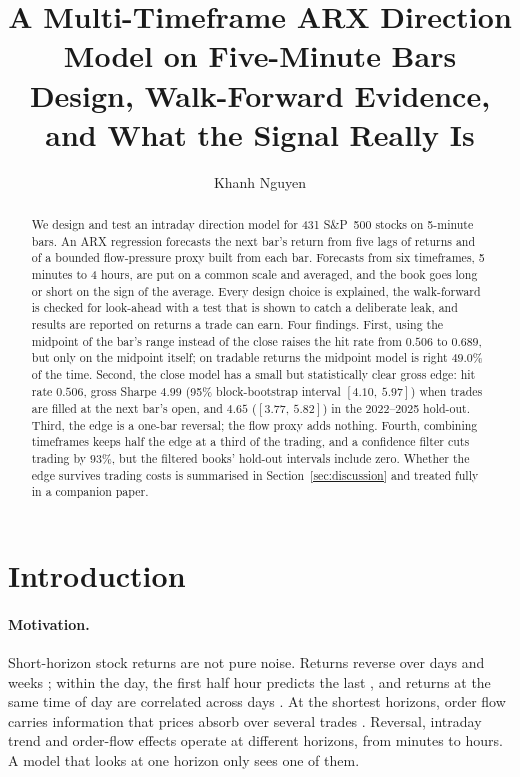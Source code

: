 \documentclass[11pt,a4paper]{article}
\title{\textbf{A Multi-Timeframe ARX Direction Model on Five-Minute Bars}\\[0.4em]
\large Design, Walk-Forward Evidence, and What the Signal Really Is}
\author{Khanh Nguyen}
\date{}
\begin{document}
\maketitle

\begin{abstract}
\noindent We design and test an intraday direction model for 431 S\&P~500 stocks on 5-minute
bars. An ARX regression forecasts the next bar's return from five lags of returns and of a bounded
flow-pressure proxy built from each bar. Forecasts from six timeframes, 5 minutes to 4 hours, are put
on a common scale and averaged, and the book goes long or short on the sign of the average. Every
design choice is explained, the walk-forward is checked for look-ahead with a test that is shown to
catch a deliberate leak, and results are reported on returns a trade can earn. Four findings. First,
using the midpoint of the bar's range instead of the close raises the hit rate from $0.506$ to
$0.689$, but only on the midpoint itself; on tradable returns the midpoint model is right
$49.0\%$ of the time. Second, the close model has a small but statistically clear gross edge: hit rate $0.506$, gross
Sharpe $4.99$ (95\% block-bootstrap interval $[4.10,\ 5.97]$) when trades are filled at the next bar's open,
and $4.65$ ($[3.77,\ 5.82]$) in the 2022--2025 hold-out. Third, the edge is a one-bar reversal; the flow proxy
adds nothing. Fourth, combining timeframes keeps half the edge at a third of the trading, and a
confidence filter cuts trading by $93\%$, but the filtered books' hold-out intervals include zero. Whether the edge survives trading costs
is summarised in Section~\ref{sec:discussion} and treated fully in a companion paper.
\end{abstract}

\section{Introduction}
\label{sec:intro}

\paragraph{Motivation.} Short-horizon stock returns are not pure noise. Returns reverse over days and
weeks \citep{lehmann1990,jegadeesh1995}; within the day, the first half hour predicts the last
\citep{gao2018}, and returns at the same time of day are correlated across days \citep{heston2010}. At
the shortest horizons, order flow carries information that prices absorb over several trades
\citep{kyle1985,hasbrouck1991}. Reversal, intraday trend and order-flow effects operate at different horizons, from minutes to hours. A
model that looks at one horizon only sees one of them.
\end{document}

